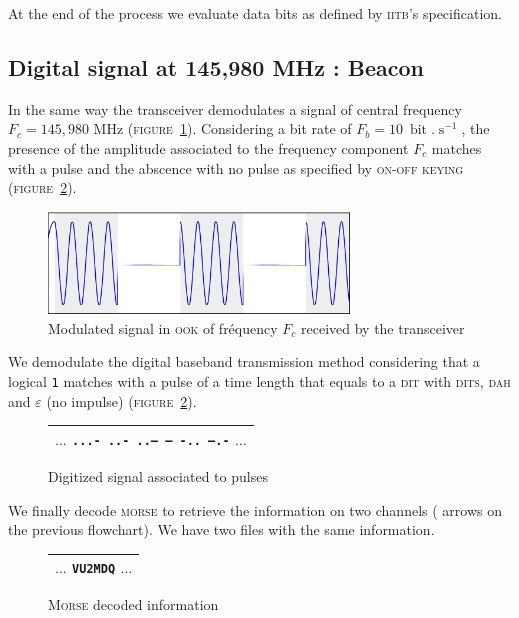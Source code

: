 \documentclass[twocolumn,pre,floats,aps,amsmath,amssymb]{revtex4}
\begin{document}
At the end of the process we evaluate data bits as defined by \textsc{iitb}'s specification\cite{IITB}.

\subsection{Digital signal at 145,980 MHz : Beacon}

In the same way the transceiver demodulates a signal of central frequency $F_c = 145,980$ MHz (\textsc{figure}~\ref{fig:signal_ook}). Considering a bit rate of $F_b = 10 \ \operatorname{bit}.\operatorname{s}^{-1}$, the presence of the amplitude associated to the frequency component $F_c$ matches with a pulse and the abscence with no pulse as specified by \textsc{on-off keying} (\textsc{figure}~\ref{fig:impulsions_morse}).

\begin{figure}[h]
  \includegraphics[width=8cm]{pictures/sans_porteuse.png}
  \caption{Modulated signal in \textsc{ook} of fr\'equency $F_c$ received by the transceiver}
  \label{fig:signal_ook}
\end{figure}

We demodulate the digital baseband transmission method considering that a logical \texttt{1} matches with a pulse of a time length that equals to a \textsc{dit} with \textsc{dits}, \textsc{dah} and $\varepsilon$ (no impulse) (\textsc{figure}~\ref{fig:impulsions_morse}).

\begin{figure}[]
  \begin{tabular}{|c|}
    \hline
    $\dots$ \textcolor{rltred}{\texttt{...- ..- ..--- -- -.. --.-}} $\dots$\\
    \hline
  \end{tabular}
  \caption{Digitized signal associated to pulses}
  \label{fig:impulsions_morse}
\end{figure}

We finally decode \textsc{morse} to retrieve the information on two channels ({ \color{rltgreen}{green} } arrows on the previous flowchart). We have two files with the same information.

\begin{figure}[]
  \begin{tabular}{|c|}
    \hline
    $\dots$ \textcolor{rltgreen}{\texttt{VU2MDQ}} $\dots$\\
    \hline
  \end{tabular}
  \caption{\textsc{Morse} decoded information}
  \label{fig:info_decode_morse}
\end{figure}
\end{document}
